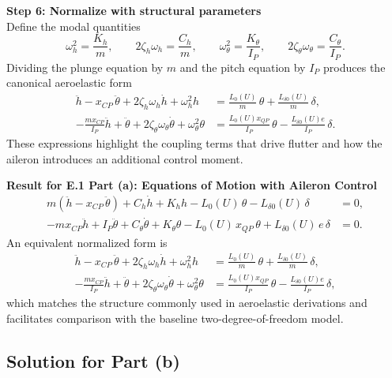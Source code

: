 \documentclass[12pt]{article}
\begin{document}
\begin{stepbox}
\textbf{Step 6: Normalize with structural parameters}\\[0.5em]
Define the modal quantities
\[
  \omega_h^2 = \frac{K_h}{m}, \qquad 2\zeta_h\omega_h = \frac{C_h}{m}, \qquad
  \omega_\theta^2 = \frac{K_\theta}{I_P}, \qquad 2\zeta_\theta\omega_\theta = \frac{C_\theta}{I_P}.
\]
Dividing the plunge equation by $m$ and the pitch equation by $I_P$ produces the canonical aeroelastic form
\[
\begin{aligned}
  \ddot h - x_{CP}\,\ddot\theta + 2\zeta_h\omega_h \dot h + \omega_h^2 h &= \frac{L_0(U)}{m}\,\theta + \frac{L_{\delta 0}(U)}{m}\,\delta,\\
  -\frac{m x_{CP}}{I_P}\ddot h + \ddot\theta + 2\zeta_\theta\omega_\theta \dot\theta + \omega_\theta^2 \theta &= \frac{L_0(U) x_{QP}}{I_P}\,\theta - \frac{L_{\delta 0}(U) e}{I_P}\,\delta.
\end{aligned}
\]
These expressions highlight the coupling terms that drive flutter and how the aileron introduces an additional control moment.
\end{stepbox}

\begin{resultsbox}
\textbf{Result for E.1 Part (a): Equations of Motion with Aileron Control}\\[0.5em]
\[
\begin{aligned}
  m(\ddot h - x_{CP}\,\ddot\theta) + C_h \dot h + K_h h - L_0(U)\,\theta - L_{\delta 0}(U)\,\delta &= 0,\\
  -m x_{CP} \ddot h + I_P \ddot\theta + C_\theta \dot\theta + K_\theta \theta - L_0(U)\,x_{QP}\,\theta + L_{\delta 0}(U)\,e\,\delta &= 0.
\end{aligned}
\]
An equivalent normalized form is
\[
\begin{aligned}
  \ddot h - x_{CP}\,\ddot\theta + 2\zeta_h\omega_h \dot h + \omega_h^2 h &= \frac{L_0(U)}{m}\,\theta + \frac{L_{\delta 0}(U)}{m}\,\delta,\\
  -\frac{m x_{CP}}{I_P}\ddot h + \ddot\theta + 2\zeta_\theta\omega_\theta \dot\theta + \omega_\theta^2 \theta &= \frac{L_0(U) x_{QP}}{I_P}\,\theta - \frac{L_{\delta 0}(U) e}{I_P}\,\delta,
\end{aligned}
\]
which matches the structure commonly used in aeroelastic derivations and facilitates comparison with the baseline two-degree-of-freedom model.
\end{resultsbox}

\subsection*{Solution for Part (b)}
\end{document}
